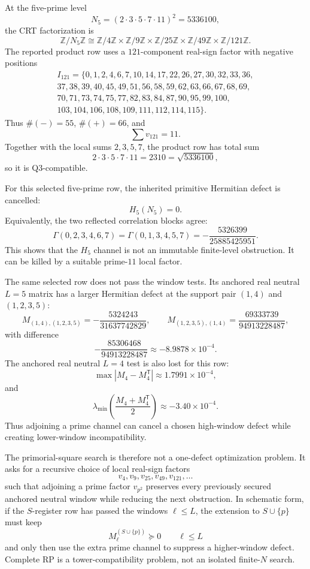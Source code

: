\begin{principle}
\label{prin:innovation-input-five-prime-cancellation-tradeoff}
At the five-prime level
$$
N_5=(2\cdot3\cdot5\cdot7\cdot11)^2=5336100,
$$
the CRT factorization is
$$
\mathbb Z/N_5\mathbb Z
\cong
\mathbb Z/4\mathbb Z
\times
\mathbb Z/9\mathbb Z
\times
\mathbb Z/25\mathbb Z
\times
\mathbb Z/49\mathbb Z
\times
\mathbb Z/121\mathbb Z.
$$
The reported product row uses a $121$-component real-sign factor with
negative positions
$$
\begin{gathered}
I_{121}=\{0,1,2,4,6,7,10,14,17,22,26,27,30,32,33,36,\\
37,38,39,40,45,49,51,56,58,59,62,63,66,67,68,69,\\
70,71,73,74,75,77,82,83,84,87,90,95,99,100,\\
103,104,106,108,109,111,112,114,115\}.
\end{gathered}
$$
Thus $\#(-)=55$, $\#(+)=66$, and
$$
\sum v_{121}=11.
$$
Together with the local sums $2,3,5,7$, the product row has total sum
$$
2\cdot3\cdot5\cdot7\cdot11
=
2310
=
\sqrt{5336100},
$$
so it is Q3-compatible.

For this selected five-prime row, the inherited primitive Hermitian defect
is cancelled:
$$
H_5(N_5)=0.
$$
Equivalently, the two reflected correlation blocks agree:
$$
\Gamma(0,2,3,4,6,7)
=
\Gamma(0,1,3,4,5,7)
=
-\frac{5326399}{25885425951}.
$$
This shows that the $H_5$ channel is not an immutable finite-level
obstruction. It can be killed by a suitable prime-$11$ local factor.

The same selected row does not pass the window tests. Its anchored real
neutral $L=5$ matrix has a larger Hermitian defect at the support pair
$(1,4)$ and $(1,2,3,5)$:
$$
M_{(1,4),(1,2,3,5)}
=
-\frac{5324243}{31637742829},
\qquad
M_{(1,2,3,5),(1,4)}
=
\frac{69333739}{94913228487},
$$
with difference
$$
-\frac{85306468}{94913228487}
\approx
-8.9878\times10^{-4}.
$$
The anchored real neutral $L=4$ test is also lost for this row:
$$
\max|M_4-M_4^{\mathsf T}|
\approx
1.7991\times10^{-4},
$$
and
$$
\lambda_{\min}\left(\frac{M_4+M_4^{\mathsf T}}2\right)
\approx
-3.40\times10^{-4}.
$$
Thus adjoining a prime channel can cancel a chosen high-window defect
while creating lower-window incompatibility.
\end{principle}

\begin{principle}
\label{prob:innovation-input-local-factor-compatibility}
The primorial-square search is therefore not a one-defect optimization
problem. It asks for a recursive choice of local real-sign factors
$$
v_{4},v_{9},v_{25},v_{49},v_{121},\ldots
$$
such that adjoining a prime factor $v_{p^2}$ preserves every previously
secured anchored neutral window while reducing the next obstruction. In
schematic form, if the $S$-register row has passed the windows
$\ell\le L$, the extension to $S\cup\{p\}$ must keep
$$
M_{\ell}^{(S\cup\{p\})}
\succeq0
\qquad
\ell\le L
$$
and only then use the extra prime channel to suppress a higher-window
defect. Complete RP is a tower-compatibility problem, not an isolated
finite-$N$ search.
\end{principle}

